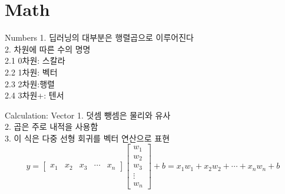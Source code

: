 \documentclass{beamer}
\begin{document}
\section{Math}
\begin{frame}{Numbers}
    1. 딥러닝의 대부분은 행렬곱으로 이루어진다\\
    2. 차원에 따른 수의 명명\\
    2.1 0차원: 스칼라\\
    2.2 1차원: 벡터\\
    2.3 2차원:행렬\\
    2.4 3차원+: 텐서
\end{frame}
\begin{frame}{Calculation: Vector}
    1. 덧셈 뺑셈은 물리와 유사\\
    2. 곱은 주로 내적을 사용함\\
    3. 이 식은 다중 선형 회귀를 벡터 연산으로 표현
    \begin{equation*}
        y = 
        \begin{bmatrix}
        x_1 & x_2 & x_3 & \cdots & x_n
        \end{bmatrix}
        \begin{bmatrix}
        w_1 \\
        w_2 \\
        w_3 \\
        \vdots \\
        w_n
        \end{bmatrix}
        + b 
        = x_1 w_1 + x_2 w_2 + \cdots + x_n w_n + b
    \end{equation*}
\end{frame}
\end{document}
